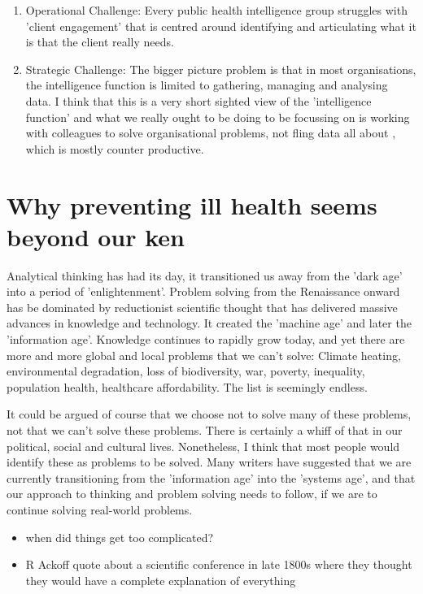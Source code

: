 \begin{enumerate}
	\item Operational Challenge: Every public health intelligence group struggles with 'client engagement' that is centred around identifying and articulating what it is that the client really needs.
	\item Strategic Challenge: The bigger picture problem is that in most organisations, the intelligence function is limited to gathering, managing and analysing data. I think that this is a very short sighted view of the 'intelligence function' and what we really ought to be doing to be focussing on is working with colleagues to solve organisational problems, not fling data all about , which is mostly counter productive.
\end{enumerate}


\section*{Why preventing ill health seems beyond our ken}

Analytical thinking has had its day, it transitioned us away from the 'dark age' into a period of 'enlightenment'. Problem solving from the Renaissance onward has be dominated by reductionist scientific thought that has delivered massive advances in knowledge and technology. It created the 'machine age' and later the 'information age'. Knowledge continues to rapidly grow today, and yet there are more and more global and local problems that we can't solve: Climate heating, environmental degradation, loss of biodiversity, war, poverty, inequality, population health, healthcare affordability. The list is seemingly endless.

It could be argued of course that we choose not to solve many of these problems, not that we can't solve these problems. There is certainly a whiff of that in our political, social and cultural lives. Nonetheless, I think that most people would identify these as problems to be solved. Many writers have suggested that we are currently transitioning from the 'information age' into the 'systems age', and that our approach to thinking and problem solving needs to follow, if we are to continue solving real-world problems.

\begin{itemize}
	\item when did things get too complicated?
	\item R Ackoff quote about a scientific conference in late 1800s where they thought they would have a complete explanation of everything
\end{itemize}

